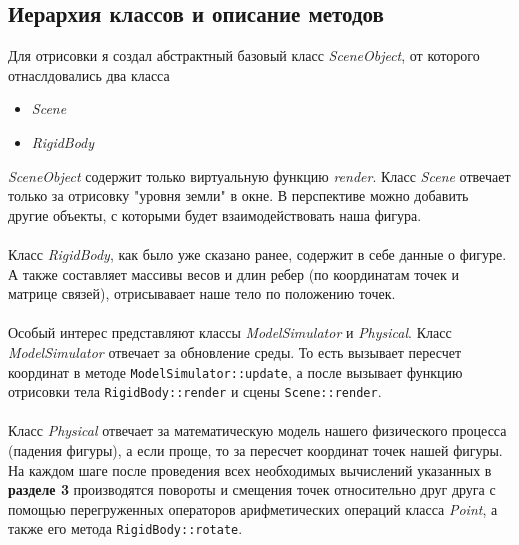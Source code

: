 \subsection{Иерархия классов и описание методов}
Для отрисовки я создал абстрактный базовый класс \textit{SceneObject}, от которого отнаслдовались два класса
\begin{itemize}
    \item \textit{Scene}
    \item \textit{RigidBody}
\end{itemize}
\textit{SceneObject} содержит только виртуальную функцию \textit{render}.
Класс \textit{Scene} отвечает только за отрисовку "уровня земли" в окне. В перспективе можно добавить другие объекты, с которыми будет взаимодействовать наша фигура.\\\\
Класс \textit{RigidBody}, как было уже сказано ранее, содержит в себе данные о фигуре. А также составляет массивы весов и длин ребер (по координатам точек и матрице связей), отрисывавает наше тело по положению точек.\\\\
Особый интерес представляют классы \textit{ModelSimulator} и \textit{Physical}. Класс \textit{ModelSimulator} отвечает за  обновление среды. То есть вызывает пересчет координат в методе \texttt{ModelSimulator::update}, а после вызывает функцию отрисовки тела \texttt{RigidBody::render} и сцены \texttt{Scene::render}.\\\\
Класс \textit{Physical} отвечает за математическую модель нашего физического процесса (падения фигуры), а если проще, то за пересчет координат точек нашей фигуры. На каждом шаге после проведения всех необходимых вычислений указанных в \textbf{разделе 3} производятся повороты и смещения точек относительно друг друга с помощью перегруженных операторов арифметических операций класса \textit{Point}, а также его метода \texttt{RigidBody::rotate}.


